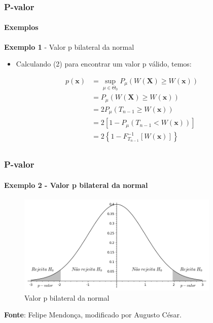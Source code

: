 \begin{frame}[c]
\frametitle{P-valor} 
\framesubtitle{Exemplos}
\begin{exampleblock}{\textbf{Exemplo 1} - Valor p bilateral da normal} %
\begin{itemize}
    \item Calculando (2) para encontrar um valor p válido, temos:
\end{itemize}
\begin{align}
    p(\textbf{x})&=\sup_{\mu \in \Theta_{0}}P_{\mu}(W(\textbf{X}) \geq W(\textbf{x})) \nonumber \\
    &=P_{\mu}(W(\textbf{X}) \geq W(\textbf{x})) \nonumber \\ \nonumber
    &=2P_{\mu}(T_{n-1} \geq W(\textbf{x})) \\
    &=2[1 - P_{\mu}(T_{n-1} < W(\textbf{x}))] \nonumber \\
    &=2\left\{1-F^{-1}_{T_{n-1}}[W(\textbf{x})]\right\} \\ \nonumber
\end{align}
\end{exampleblock}
\end{frame}

\begin{frame}[c] 
\frametitle{P-valor} 
\framesubtitle{Exemplo 2 - Valor p bilateral da normal}
\begin{figure}[h]
    \centering
    \includegraphics[height=4.75cm]{bilateral.png}
    \caption{Valor p bilateral da normal}
    \label{fig:bilateral}
\end{figure}
\textbf{Fonte}: Felipe Mendonça, modificado por Augusto César.
\end{frame}

